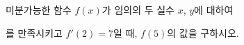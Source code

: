 미분가능한 함수 $f(x)$가 임의의 두 실수 $x$, $y$에 대하여 \par\smallskip{}\par\smallskip\noindent 를 만족시키고 $f'(2)=7$일 때, $f(5)$의 값을 구하시오.
